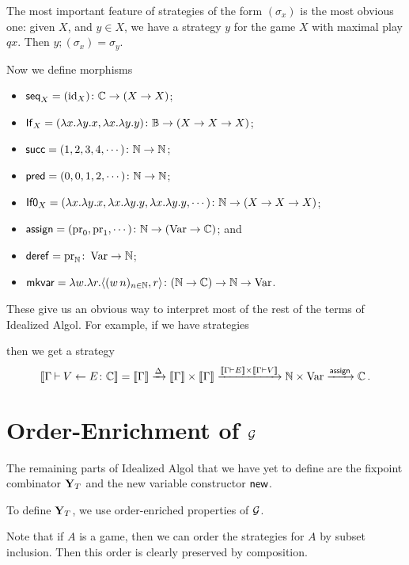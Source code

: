 \documentclass[11pt]{report}
\begin{document}
The most important feature of strategies of the form $(\sigma_x)$ is the most obvious one: given $X$, and $y\in X$, we have a strategy $y$ for the game $X$ with maximal play $qx$.  
Then $y;(\sigma_x) = \sigma_y$.

Now we define morphisms
\begin{itemize}
  \item $\operatorname{{\mathsf{seq}}}_X = (\operatorname{id}_X) \colon \mathbb{C} \to (X \to X)$;
  \item $\operatorname{\mathsf{If}}_X = (\lambda x.\lambda y.x,\lambda x.\lambda y.y) \colon \mathbb{B} \to (X \to X \to X)$;
  \item $\operatorname{{\mathsf{succ}}} = (1, 2, 3, 4,\cdots) \colon \mathbb{N} \to \mathbb{N}$;
  \item $\operatorname{{\mathsf{pred}}} = (0,0,1,2,\cdots)\colon \mathbb{N} \to \mathbb{N}$;
  \item $\operatorname{{\mathsf{If0}}}_X = (\lambda x.\lambda y.x,\lambda x.\lambda y.y,\lambda x.\lambda y.y,\cdots)\colon \mathbb{N} \to (X \to X \to X)$;
  \item $\operatorname{\mathsf{assign}} = (\operatorname{pr}_0,\operatorname{pr}_1,\cdots) \colon \mathbb{N} \to (\operatorname{Var} \to \mathbb{C})$; and
  \item $\operatorname{\mathsf{deref}} = \operatorname{pr}_{\mathbb{N}} \colon \operatorname{Var} \to \mathbb{N}$;
  \item $\operatorname{{\mathsf{mkvar}}} = \lambda w.\lambda r.\langle (w\,n)_{n\in\mathbb{N}},r\rangle \colon (\mathbb{N} \to \mathbb{C}) \to \mathbb{N} \to \operatorname{Var}$.
\end{itemize}
These give us an obvious way to interpret most of the rest of the terms of Idealized Algol.  
For example, if we have strategies
then we get a strategy
\[
  \left\llbracket\Gamma\mathbin{\vdash} V\gets E \colon \mathbb{C}\right\rrbracket = \left\llbracket\Gamma\right\rrbracket \xrightarrow{\Delta} \left\llbracket\Gamma\right\rrbracket\times\left\llbracket\Gamma\right\rrbracket \xrightarrow{\left\llbracket\Gamma\mathbin{\vdash} E\right\rrbracket\times\left\llbracket\Gamma\mathbin{\vdash} V\right\rrbracket} \mathbb{N} \times \operatorname{Var} \xrightarrow{\operatorname{\mathsf{assign}}} \mathbb{C}\,.
  \]

\section{Order-Enrichment of $\mathcal G$}

The remaining parts of Idealized Algol that we have yet to define are the fixpoint combinator $\mathbf{Y}_T$ and the new variable constructor $\operatorname{{\mathsf{new}}}$.  

To define $\mathbf{Y}_T$, we use order-enriched properties of $\mathcal G$.  

Note that if $A$ is a game, then we can order the strategies for $A$ by subset inclusion.  
Then this order is clearly preserved by composition.  
\end{document}
